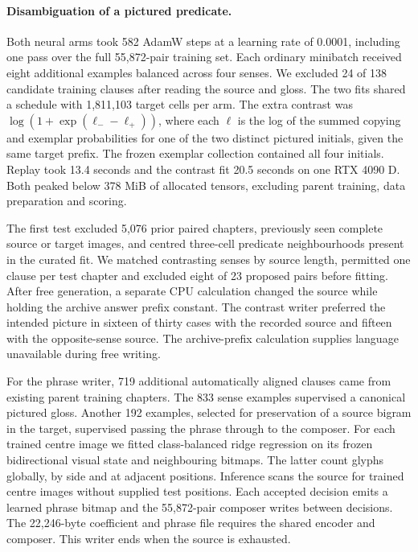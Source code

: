 \paragraph{Disambiguation of a pictured predicate.}
Both neural arms took 582 AdamW steps at a learning rate of 0.0001, including one pass over the full 55,872-pair training set. Each ordinary minibatch received eight additional examples balanced across four senses. We excluded 24 of 138 candidate training clauses after reading the source and gloss. The two fits shared a schedule with 1,811,103 target cells per arm. The extra contrast was $\log(1+\exp(\ell_{-}-\ell_{+}))$, where each $\ell$ is the log of the summed copying and exemplar probabilities for one of the two distinct pictured initials, given the same target prefix. The frozen exemplar collection contained all four initials. Replay took 13.4 seconds and the contrast fit 20.5 seconds on one RTX 4090 D. Both peaked below 378 MiB of allocated tensors, excluding parent training, data preparation and scoring.

The first test excluded 5,076 prior paired chapters, previously seen complete source or target images, and centred three-cell predicate neighbourhoods present in the curated fit. We matched contrasting senses by source length, permitted one clause per test chapter and excluded eight of 23 proposed pairs before fitting. After free generation, a separate CPU calculation changed the source while holding the archive answer prefix constant. The contrast writer preferred the intended picture in sixteen of thirty cases with the recorded source and fifteen with the opposite-sense source. The archive-prefix calculation supplies language unavailable during free writing.

For the phrase writer, 719 additional automatically aligned clauses came from existing parent training chapters. The 833 sense examples supervised a canonical pictured gloss. Another 192 examples, selected for preservation of a source bigram in the target, supervised passing the phrase through to the composer. For each trained centre image we fitted class-balanced ridge regression on its frozen bidirectional visual state and neighbouring bitmaps. The latter count glyphs globally, by side and at adjacent positions. Inference scans the source for trained centre images without supplied test positions. Each accepted decision emits a learned phrase bitmap and the 55,872-pair composer writes between decisions. The 22,246-byte coefficient and phrase file requires the shared encoder and composer. This writer ends when the source is exhausted.

